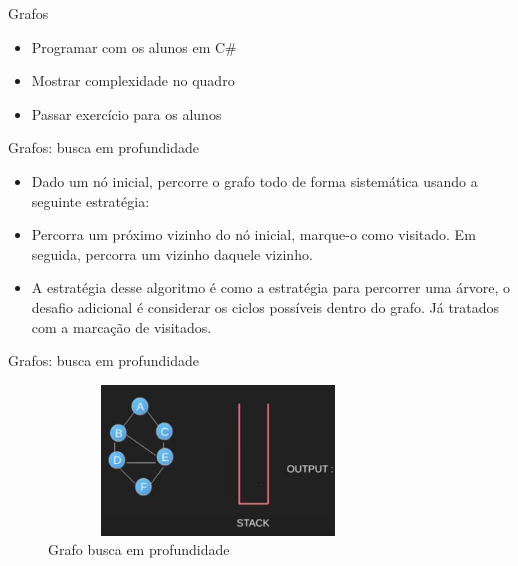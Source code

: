 \begin{frame}
	\begin{block}{Grafos}
		\begin{itemize}
			\item Programar com os alunos em C\#	
			\item Mostrar complexidade no quadro	
			\item Passar exercício para os alunos
		\end{itemize}
	\end{block}
\end{frame}

\begin{frame}
	\begin{block}{Grafos: busca em profundidade}
		\begin{itemize}
			\item Dado um nó inicial, percorre o grafo todo de forma sistemática usando a seguinte estratégia:
			\item Percorra um próximo vizinho do nó inicial, marque-o como visitado. Em seguida, percorra um vizinho daquele vizinho.
			\item A estratégia desse algoritmo é como a estratégia para percorrer uma árvore, o desafio adicional é considerar os ciclos possíveis dentro do grafo. Já tratados com a marcação de visitados.
		\end{itemize}
	\end{block}
\end{frame}


\begin{frame}
	\begin{block}{Grafos: busca em profundidade}
		\begin{figure}[!htb]
			\centering	  
			\includegraphics[height=4cm, width = 9cm]{./pic/dfs1.png}
			\caption{Grafo busca em profundidade}
		\end{figure}
	\end{block}
\end{frame}


